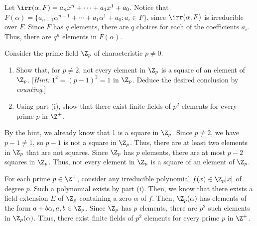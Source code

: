 \begin{solution}
  Let $\irr(\alpha, F) = a_nx^n + \cdots + a_1x^1 + a_0$. Notice that $F(\alpha) = \{a_{n - 1}\alpha^{n - 1} + \cdots + a_1\alpha^1 + a_0 : a_i \in F\}$, since $\irr(\alpha, F)$ is irreducible over $F$. Since $F$ has $q$ elements, there are $q$ choices for each of the coefficients $a_i$. Thus, there are $q^n$ elements in $F(\alpha)$.
\end{solution}

\begin{problem}[39.32]
  Consider the prime field $\Z_p$ of characteristic $p \ne 0$.
  \begin{enumerate}
    \item Show that, for $p \ne 2$, not every element in $\Z_p$ is a square of an element of $\Z_p$. [\textit{Hint:} $1^2 = (p - 1)^2 = 1$ in $\Z_p$. Deduce the desired conclusion by \textit{counting}.]
    \item Using part (i), show that there exist finite fields of $p^2$ elements for every prime $p$ in $\Z^+$.
  \end{enumerate}
\end{problem}

\begin{solution}[(i)]
  By the hint, we already know that 1 is a square in $\Z_p$. Since $p \ne 2$, we have $p - 1 \ne 1$, so $p - 1$ is not a square in $\Z_p$. Thus, there are at least two elements in $\Z_p$ that are not squares. Since $\Z_p$ has $p$ elements, there are at most $p - 2$ squares in $\Z_p$. Thus, not every element in $\Z_p$ is a square of an element of $\Z_p$.
\end{solution}

\begin{solution}[(ii)]
  For each prime $p \in \Z^+$, consider any irreducible polynomial $f(x) \in \Z_p[x]$ of degree $p$. Such a polynomial exists by part (i). Then, we know that there exists a field extension $E$ of $\Z_p$ containing a zero $\alpha$ of $f$. Then, $\Z_p(\alpha)$ has elements of the form $a + b\alpha, a, b \in \Z_p$. Since $\Z_p$ has $p$ elements, there are $p^2$ such elements in $\Z_p(\alpha)$. Thus, there exist finite fields of $p^2$ elements for every prime $p$ in $\Z^+$.
\end{solution}
